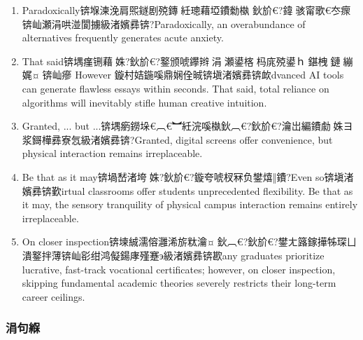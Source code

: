 ﻿\documentclass[lang=cn,11pt]{elegantbook}
\begin{document}
\begin{enumerate}
\item Paradoxically锛堢湅浼肩煕鐩剧殑鏄紝璁藉埡鐨勬槸 鈥斺€?鍏骇甯歌€冭瘝锛屾瀬涓哄湴閬擄級渚嬪彞锛?Paradoxically, an overabundance of alternatives frequently generates acute anxiety.
\item That said锛堣瘽铏藉姝?鈥斺€?鐜颁唬鑻辫涓瀬鍙楁杩庣殑鍙ｈ鍖栧鏈繃娓¤锛屾瘮 However 鏇村姞鍦嗘鼎娴佺晠锛塡渚嬪彞锛欰dvanced AI tools can generate flawless essays within seconds. That said, total reliance on algorithms will inevitably stifle human creative intuition.
\item Granted, ... but ...锛堣瘹鐒垛€︹€︼紝浣嗘槸鈥︹€?鈥斺€?瀹岀編鐨勮姝ヨ浆鎶樺彞寮忥級渚嬪彞锛?Granted, digital screens offer convenience, but physical interaction remains irreplaceable.
\item Be that as it may锛堝嵆渚垮姝?鈥斺€?鏇夸唬杈冧负鐢熺‖鐨?Even so锛塡渚嬪彞锛歏irtual classrooms offer students unprecedented flexibility. Be that as it may, the sensory tranquility of physical campus interaction remains entirely irreplaceable.
\item On closer inspection锛堜絾濡傛灉浠旂粏瀹¤鈥︹€?鈥斺€?鐢ㄤ簬鎵撶牬琛ㄩ潰鐜拌薄锛屾彮绀鸿儗鍚庨殣蹇э級渚嬪彞锛歁any graduates prioritize lucrative, fast-track vocational certificates; however, on closer inspection, skipping fundamental academic theories severely restricts their long-term career ceilings.
\end{enumerate}

\subsubsection{涓句緥}
\end{document}
